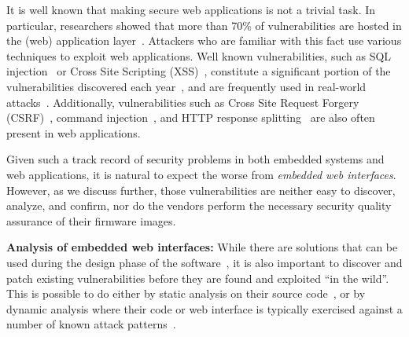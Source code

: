\documentclass[conference]{./templates/ndss/IEEEtran}
\newcounter{t0d0_counter}
\newcounter{pr00f_counter}
\begin{document}
It is well known that making secure web applications  is not a trivial task.
In particular, researchers showed that more than 70\% of vulnerabilities 
are hosted in the (web) application layer~\cite{gartner70percent}. 
Attackers who are familiar with this fact 
use various techniques to exploit web applications.
Well known vulnerabilities, such as SQL injection~\cite{boyd2004sqlrand}
or Cross Site Scripting (XSS)~\cite{vogt2007cross}, constitute a significant portion of the vulnerabilities discovered
each year~\cite{christey2007vulnerability}, and are frequently used 
in real-world attacks~\cite{firehost-superfecta-2013}. 
Additionally, vulnerabilities such as 
Cross Site Request Forgery (CSRF)~\cite{barth2008robust}, command
injection~\cite{su2006essence}, and HTTP response
splitting~\cite{klein2004divide} are also often present in web
applications.

Given such a track record of security problems in both embedded systems and
web applications, it is natural to expect the worse from 
\emph{embedded web interfaces}. 
However, as we discuss further, those vulnerabilities are
neither easy to discover, analyze, and confirm, nor do the vendors perform the
necessary security quality assurance of their firmware images. 


\noindent \textbf{Analysis of embedded web interfaces:}
While there are solutions that can be used during the design phase of
the software~\cite{hooimeijer2011fast, samuel2011context,
  livshits2013towards, saxena2011scriptgard}, it is also important to
discover and patch existing vulnerabilities before they are found and
exploited ``in the wild''.
This is possible to do either by
static analysis on their source code~\cite{balzarotti2008saner,
  jovanovic2010static, doupe2011fear, Dahse:rips:ndss14}, or by dynamic analysis 
where their code or web interface is typically
exercised against a number of known attack
patterns~\cite{elie-sp2010-AutoBlackBoxWebTest,
  elie-bh2009-EmbedInterfMassInsec}.
\end{document}
